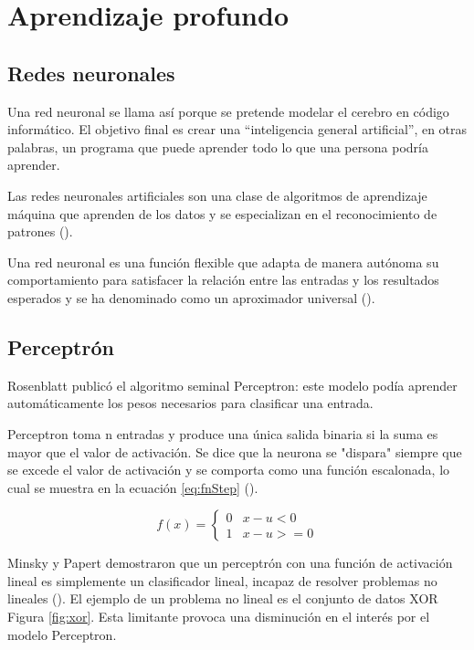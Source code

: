 \section{Aprendizaje profundo}

\subsection{Redes neuronales}

Una red neuronal se llama así porque se pretende modelar el cerebro en código informático. El objetivo final es crear una “inteligencia general artificial”, en otras palabras, un programa que puede aprender todo lo que una persona podría aprender.

Las redes neuronales artificiales son una clase de algoritmos de aprendizaje máquina que aprenden de los datos y se especializan en el reconocimiento de patrones (\cite{rosebrock2017deep}).

Una red neuronal es una función flexible que adapta de manera autónoma su comportamiento para satisfacer la relación entre las entradas y los resultados esperados y se ha denominado como un aproximador universal (\cite{goyal2018Deep}).

\subsection{Perceptrón}

Rosenblatt publicó el algoritmo seminal Perceptron: este modelo podía aprender automáticamente los pesos necesarios para clasificar una entrada.

Perceptron toma n entradas y produce una única salida binaria si la suma es mayor que el valor de activación. Se dice que la neurona se "dispara" siempre que se excede el valor de activación y se comporta como una función escalonada, lo cual se muestra en la ecuación \ref{eq:fnStep} (\cite{goyal2018Deep}).

\begin{equation}
\label{eq:fnStep}
    f\left(x\right)=\begin{cases}0 & x -u < 0\\1 & x -u >= 0\end{cases}
\end{equation}



Minsky y Papert demostraron que un perceptrón con una función de activación lineal es simplemente un clasificador lineal, incapaz de resolver problemas no lineales (\cite{rosebrock2017deep}). El ejemplo de un problema no lineal es el conjunto de datos XOR Figura \ref{fig:xor}. Esta limitante provoca una disminución en el interés por el modelo Perceptron.

